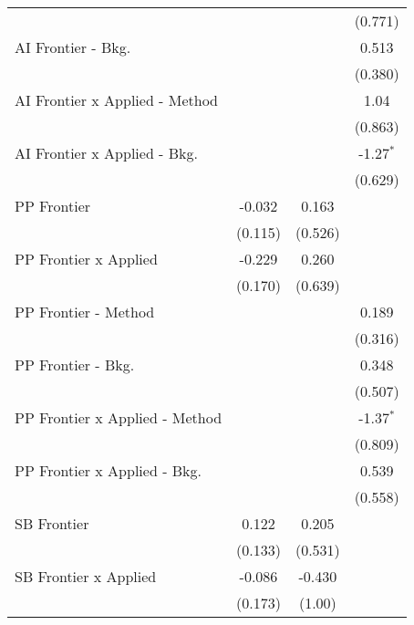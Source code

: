 \begin{tabular}{lccc}
                                  &               &         & (0.771)\\   
   AI Frontier - Bkg.             &               &         & 0.513\\   
                                  &               &         & (0.380)\\   
   AI Frontier x Applied - Method &               &         & 1.04\\   
                                  &               &         & (0.863)\\   
   AI Frontier x Applied - Bkg.   &               &         & -1.27$^{*}$\\   
                                  &               &         & (0.629)\\   
   PP Frontier                    & -0.032        & 0.163   &   \\   
                                  & (0.115)       & (0.526) &   \\   
   PP Frontier x Applied          & -0.229        & 0.260   &   \\   
                                  & (0.170)       & (0.639) &   \\   
   PP Frontier - Method           &               &         & 0.189\\   
                                  &               &         & (0.316)\\   
   PP Frontier - Bkg.             &               &         & 0.348\\   
                                  &               &         & (0.507)\\   
   PP Frontier x Applied - Method &               &         & -1.37$^{*}$\\   
                                  &               &         & (0.809)\\   
   PP Frontier x Applied - Bkg.   &               &         & 0.539\\   
                                  &               &         & (0.558)\\   
   SB Frontier                    & 0.122         & 0.205   &   \\   
                                  & (0.133)       & (0.531) &   \\   
   SB Frontier x Applied          & -0.086        & -0.430  &   \\   
                                  & (0.173)       & (1.00)  &   \\   

\end{tabular}

